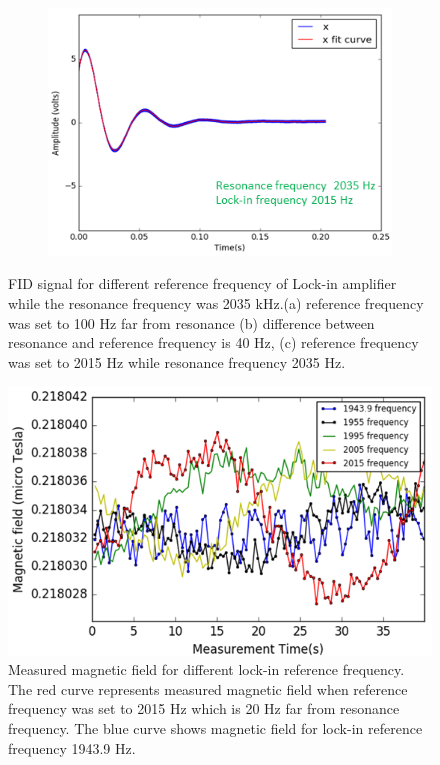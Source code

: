 \begin{figure}
\begin{subfigure}[b]{0.4\textwidth}
        \includegraphics[width=\textwidth]{figures/reference_frequency2}
        \caption{}
        \label{fig:close to resonance}
    \end{subfigure}
    \caption{FID signal for different reference frequency of Lock-in amplifier while the resonance frequency was 2035 kHz.(a) reference frequency was set to 100 Hz far from resonance (b) difference between resonance and reference frequency is 40 Hz, (c) reference frequency was set to 2015 Hz while resonance frequency 2035 Hz. \label{fig:different reference signal}}
\end{figure}
\begin{figure}[h]
\centering\includegraphics[width=0.8\linewidth]{figures/reference_frequency}
\caption{Measured magnetic field for different lock-in reference frequency. The red curve represents measured magnetic field when reference frequency was set to 2015 Hz which is 20 Hz far from resonance frequency. The blue curve shows magnetic field for lock-in reference frequency 1943.9 Hz.\label{fig:field for different lockin ref freq}}
\end{figure}

